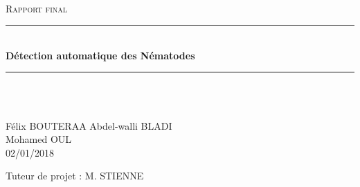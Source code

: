 \documentclass[12pt,a4paper]{article}
\newcommand{\HRule}{\rule{\linewidth}{0.5mm}}
\begin{document}
\begin{titlepage}
  \begin{sffamily}
  \begin{center}
\begin{figure}

\end{figure}

    \\[2.5cm]

    \textsc{\Large Rapport final}\\[1.5cm]

    \HRule \\[0.4cm]
    { \huge \bfseries Détection automatique des Nématodes \\[0.4cm] }
 \HRule \\[1.5cm]
 
 \\[8cm]


        \begin{flushleft}
	Félix BOUTERAA 
	Abdel-walli BLADI \\
	Mohamed OUL \\
	02/01/2018 \\
	\end{flushleft}  
    
    \begin{flushright}
Tuteur de projet : M. STIENNE
\end{flushright}  

  \end{center}
  \end{sffamily}
\end{titlepage}

\newpage

\tableofcontents

\newpage

\listoffigures

\newpage
\end{document}
